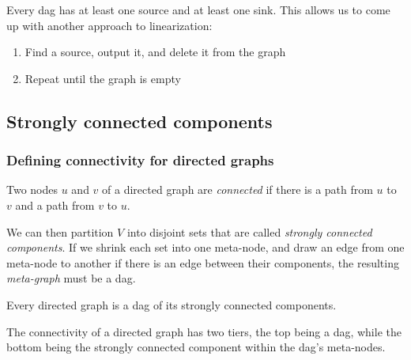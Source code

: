 \begin{property}
  Every dag has at least one source and at least one sink.
  This allows us to come up with another approach to linearization:
  \begin{enumerate}
    \item{Find a source, output it, and delete it from the graph}
    \item{Repeat until the graph is empty}
  \end{enumerate}
\end{property}

\subsection{Strongly connected components}

\subsubsection{Defining connectivity for directed graphs}
\begin{definition}
  Two nodes $u$ and $v$ of a directed graph are \textit{connected} if there is a path from $u$ to $v$ and a path from $v$ to $u$.
\end{definition}
We can then partition $V$ into disjoint sets that are called \textit{strongly connected components}.
If we shrink each set into one meta-node, and draw an edge from one meta-node to another if there is an edge between their components, the resulting \textit{meta-graph} must be a dag.
\begin{property}
  Every directed graph is a dag of its strongly connected components.
\end{property}
The connectivity of a directed graph has two tiers, the top being a dag, while the bottom being the strongly connected component within the dag's meta-nodes.

